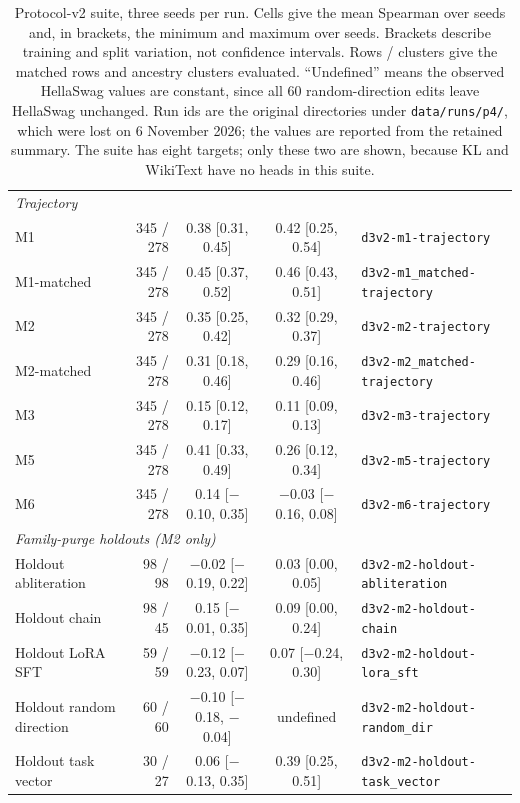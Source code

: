 \begin{table}[t]
\begin{tabular}{lrcclc}
\multicolumn{5}{l}{\emph{Trajectory}} \\
M1 & 345 / 278 & 0.38 [0.31, 0.45] & 0.42 [0.25, 0.54] & \texttt{d3v2-m1-trajectory} \\
M1-matched & 345 / 278 & 0.45 [0.37, 0.52] & 0.46 [0.43, 0.51] & \texttt{d3v2-m1\_matched-trajectory} \\
M2 & 345 / 278 & 0.35 [0.25, 0.42] & 0.32 [0.29, 0.37] & \texttt{d3v2-m2-trajectory} \\
M2-matched & 345 / 278 & 0.31 [0.18, 0.46] & 0.29 [0.16, 0.46] & \texttt{d3v2-m2\_matched-trajectory} \\
M3 & 345 / 278 & 0.15 [0.12, 0.17] & 0.11 [0.09, 0.13] & \texttt{d3v2-m3-trajectory} \\
M5 & 345 / 278 & 0.41 [0.33, 0.49] & 0.26 [0.12, 0.34] & \texttt{d3v2-m5-trajectory} \\
M6 & 345 / 278 & 0.14 [$-$0.10, 0.35] & $-$0.03 [$-$0.16, 0.08] & \texttt{d3v2-m6-trajectory} \\
\multicolumn{5}{l}{\emph{Family-purge holdouts (M2 only)}} \\
Holdout abliteration & 98 / 98 & $-$0.02 [$-$0.19, 0.22] & 0.03 [0.00, 0.05] & \texttt{d3v2-m2-holdout-abliteration} \\
Holdout chain & 98 / 45 & 0.15 [$-$0.01, 0.35] & 0.09 [0.00, 0.24] & \texttt{d3v2-m2-holdout-chain} \\
Holdout LoRA SFT & 59 / 59 & $-$0.12 [$-$0.23, 0.07] & 0.07 [$-$0.24, 0.30] & \texttt{d3v2-m2-holdout-lora\_sft} \\
Holdout random direction & 60 / 60 & $-$0.10 [$-$0.18, $-$0.04] & undefined & \texttt{d3v2-m2-holdout-random\_dir} \\
Holdout task vector & 30 / 27 & 0.06 [$-$0.13, 0.35] & 0.39 [0.25, 0.51] & \texttt{d3v2-m2-holdout-task\_vector} \\\bottomrule
\end{tabular}
\caption{Protocol-v2 suite, three seeds per run. Cells give the mean Spearman over seeds and, in brackets, the minimum and maximum over seeds. Brackets describe training and split variation, not confidence intervals. Rows / clusters give the matched rows and ancestry clusters evaluated. ``Undefined'' means the observed HellaSwag values are constant, since all 60 random-direction edits leave HellaSwag unchanged. Run ids are the original directories under \texttt{data/runs/p4/}, which were lost on 6 November 2026; the values are reported from the retained summary. The suite has eight targets; only these two are shown, because KL and WikiText have no heads in this suite.}
\label{tab:v2-suite}
\end{table}

